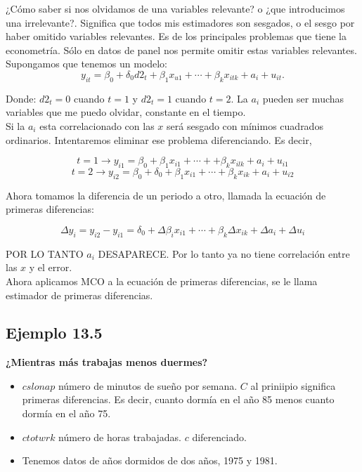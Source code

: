 ¿Cómo saber si nos olvidamos de una variables relevante? o ¿que introducimos una irrelevante?. Significa que todos mis estimadores son sesgados, o el sesgo por haber omitido variables relevantes. Es de los principales problemas que tiene la econometría. Sólo en datos de panel nos permite omitir estas variables relevantes. Supongamos que tenemos un modelo:
$$y_{it} = \beta_0 + \delta_0 d2_t + \beta_1 x_{u1} + \cdots + \beta_k x_{itk} + a_i + u_{it}.$$

Donde: $d2_t=0$ cuando $t=1$ y $d2_t=1$ cuando $t=2$. La $a_i$ pueden ser muchas variables que me puedo olvidar, constante en el tiempo.\\

Si la $a_i$ esta correlacionado con las $x$ será sesgado con mínimos cuadrados ordinarios. Intentaremos eliminar ese problema diferenciando. Es decir,

$$ t = 1 \rightarrow y_{i1} = \beta_0 + \beta_1 x_{i1} +\cdots + + \beta_k x_{ilk} + a_i + u_{i1}$$
$$ t = 2 \rightarrow y_{i2} = \beta_0 + \delta_0 + \beta_1 x_{i1} + \cdots + \beta_k x_{ik} + a_i + u_{i2}$$

Ahora tomamos la diferencia de un periodo a otro, llamada la ecuación de primeras diferencias:

$$\Delta y_i  = y_{i2} - y_{i1} = \delta_0 + \Delta \beta_i x_{i1}  + \cdots + \beta_k \Delta x_{ik} + \Delta a_i + \Delta u_i$$

POR LO TANTO $a_i$ DESAPARECE. Por lo tanto ya no tiene correlación entre las $x$ y el error.\\

Ahora aplicamos MCO a la ecuación de primeras diferencias, se le llama estimador de primeras diferencias.\\


\subsection{Ejemplo 13.5}

\textbf{¿Mientras más trabajas menos duermes?}\\

\begin{itemize}
    \item $cslonap$ número de minutos de sueño por semana. $C$ al priniipio significa primeras diferencias. Es decir, cuanto dormía en el año 85 menos cuanto dormía en el año 75.
    \item $ctotwrk$ número de horas trabajadas. $c$ diferenciado.
    \item Tenemos datos de años dormidos de dos años, 1975 y 1981.
\end{itemize}

